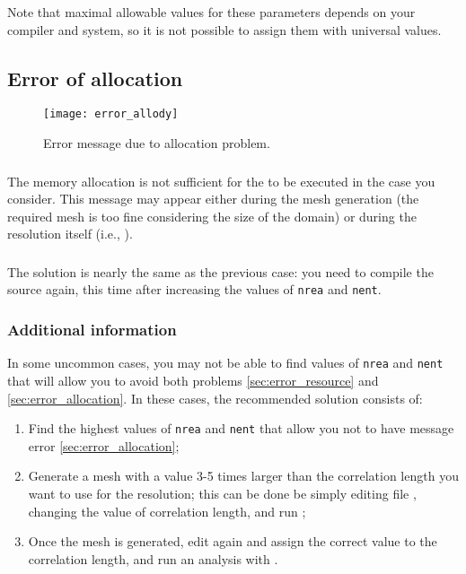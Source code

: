 Note that maximal allowable values for these parameters depends on your compiler and system, so it is not possible to assign them with universal values.



\subsection{Error of allocation \label{sec:error_allocation}}

\begin{figure}[htpb]
\centering
\texttt{[image: error\_allody]}
\caption{Error message due to allocation problem.\label{fig:error_allocation}}
\end{figure}

\subsubsection{\question}

The memory allocation is not sufficient for the \diva to be executed in the case you consider. This message may appear either during the mesh generation (the required mesh is too fine considering the size of the domain) or during the resolution itself (i.e., ).

\subsubsection{\answer}

The solution is nearly the same as the previous case: you need to compile the source again, this time after increasing the values of \texttt{nrea} and \texttt{nent}.

\subsubsection[Additional information]{Additional information \expert}

In some uncommon cases, you may not be able to find values of \texttt{nrea} and \texttt{nent} that will allow you to avoid both problems \ref{sec:error_resource} and \ref{sec:error_allocation}. In these cases, the recommended solution consists of:
\begin{enumerate}
\item Find the highest values of \texttt{nrea} and \texttt{nent} that allow you not to have message error \ref{sec:error_allocation};
\item Generate a mesh with a value 3-5 times larger than the correlation length you want to use for the resolution; this can be done be simply editing file , changing the value of correlation length, and run ;
\item Once the mesh is generated, edit again  and assign the correct value to the correlation length, and run an analysis with .
\end{enumerate}

